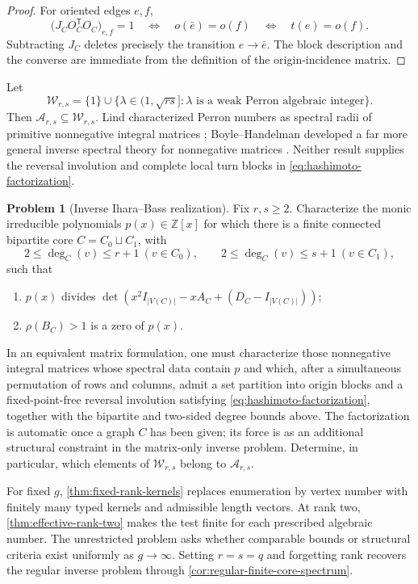 \documentclass[11pt]{amsart}
\theoremstyle{plain}
\theoremstyle{definition}
\newtheorem{problem}[theorem]{Problem}
\theoremstyle{remark}
\newcommand{\cA}{\mathcal A}
\newcommand{\ZZ}{\mathbb Z}
\begin{document}
\begin{proof}
For oriented edges \(e,f\),
\[
  \bigl(J_CO_C^{\mathsf T}O_C\bigr)_{e,f}=1
  \quad\Longleftrightarrow\quad
  o(\bar e)=o(f)
  \quad\Longleftrightarrow\quad
  t(e)=o(f).
\]
Subtracting \(J_C\) deletes precisely the transition \(e\to\bar e\).
The block description and the converse are immediate from the definition of
the origin-incidence matrix.
\end{proof}

Let
\[
  \mathcal W_{r,s}
  =\{1\}\cup\{\lambda\in(1,\sqrt{rs}]:
      \lambda\text{ is a weak Perron algebraic integer}\}.
\]
Then \(\cA_{r,s}\subseteq\mathcal W_{r,s}\).  Lind characterized Perron
numbers as spectral radii of primitive nonnegative integral matrices
\cite{Lind1984}; Boyle--Handelman developed a
far more general inverse spectral theory for nonnegative matrices
\cite{BoyleHandelman1991}.  Neither result supplies the reversal involution
and complete local turn blocks in
\eqref{eq:hashimoto-factorization}.

\begin{problem}[Inverse Ihara--Bass realization]\label{prob:inverse-ihara}
Fix \(r,s\geq2\).  Characterize the monic irreducible polynomials
\(p(x)\in\ZZ[x]\) for which there is a finite connected bipartite core
\(C=C_0\sqcup C_1\), with
\[
  2\leq\deg_C(v)\leq r+1\ (v\in C_0),
  \qquad
  2\leq\deg_C(v)\leq s+1\ (v\in C_1),
\]
such that
\begin{enumerate}[label=(\roman*)]
  \item \(p(x)\) divides
  \(\det(x^2I_{|V(C)|}-xA_C+(D_C-I_{|V(C)|}))\);
  \item \(\rho(B_C)>1\) is a zero of \(p(x)\).
\end{enumerate}
In an equivalent matrix formulation, one must characterize those
nonnegative integral matrices whose spectral data contain \(p\) and which,
after a simultaneous permutation of rows and columns, admit a set partition
into origin blocks and a fixed-point-free reversal involution satisfying
\eqref{eq:hashimoto-factorization}, together with the bipartite and two-sided
degree bounds above.  The factorization is automatic once a graph \(C\) has
been given; its force is as an additional structural constraint in the
matrix-only inverse problem.
Determine, in particular, which elements of \(\mathcal W_{r,s}\) belong to
\(\cA_{r,s}\).
\end{problem}

For fixed \(g\), \cref{thm:fixed-rank-kernels} replaces enumeration by
vertex number with finitely many typed kernels and admissible length vectors.
At rank two, \cref{thm:effective-rank-two} makes the test finite for each
prescribed algebraic number.  The unrestricted problem asks whether
comparable bounds or structural criteria exist uniformly as
\(g\to\infty\).  Setting \(r=s=q\) and forgetting rank recovers the regular
inverse problem through \cref{cor:regular-finite-core-spectrum}.
\end{document}
